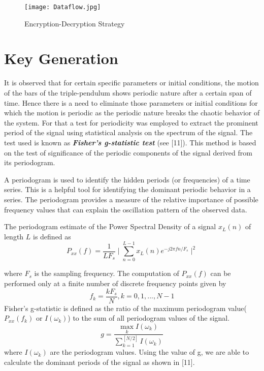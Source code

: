 \begin{figure}[H]
\centering
\texttt{[image: Dataflow.jpg]}
\caption{Encryption-Decryption Strategy}\label{fig:Dataflow}
\end{figure}



\section{Key Generation}
It is observed that for certain specific parameters or initial conditions, the motion of the bars of the triple-pendulum shows periodic nature after a certain span of time. Hence there is a need to eliminate those parameters or initial conditions for which the motion is periodic as the periodic nature breaks the chaotic behavior of the system. For that a test for periodicity was employed to extract the prominent period of the signal using statistical analysis on the spectrum of the signal. The test used is known as {\bf{\em Fisher's g-statistic test}} (see [11]). This method is based on the test of significance of the periodic components of the signal derived from its periodogram. 

A periodogram is used to identify the hidden periods (or frequencies) of a time series. This is a helpful tool for identifying the dominant periodic behavior in a series. The periodogram provides a measure of the relative importance of possible frequency values that can explain the oscillation pattern of the observed data.

The periodogram estimate of the Power Spectral Density of a signal $x_{L}(n)$ of length $L$ is defined as
\begin{equation}
 P_{xx}(f) = \frac{1}{LF_{s}} \mid \sum_{n=0}^{L-1} x_{L}(n)e^{-j2\pi fn/F_{s}} \mid^2
\end{equation}

where $F_{s}$ is the sampling frequency.
The computation of $P_{xx}(f)$ can be performed only at a finite number of discrete frequency points given by
\begin{equation}
 f_{k} = \frac{kF_{s}}{N} , k = 0,1, ... , N-1 
\end{equation}
Fisher's g-statistic is defined as the ratio of the maximum periodogram value($P_{xx}(f_{k})$ or $I(\omega_{k})$) to the sum of all periodogram values of the signal.
\begin{equation}
    g = \frac{\max_{k} I(\omega_{k})}{\sum_{k=1}^{[N/2]}I(\omega_{k})}  
\end{equation}
where $I(\omega_{k})$ are the periodogram values. Using the value of g, we are able to calculate the dominant periods of the signal as shown in [11].

